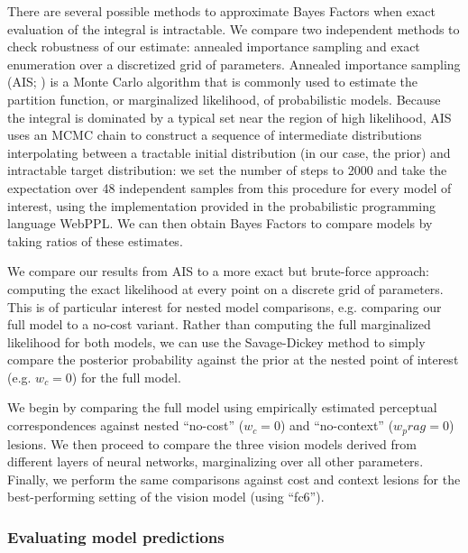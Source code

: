 \documentclass[9pt,twocolumn,twoside]{pnas-new}
\begin{document}
{There are several possible methods to approximate Bayes Factors when exact evaluation of the integral is intractable. We compare two independent methods to check robustness of our estimate: annealed importance sampling and exact enumeration over a discretized grid of parameters. Annealed importance sampling (AIS; \cite{neal2001}) is a Monte Carlo algorithm that is commonly used to estimate the partition function, or marginalized likelihood, of probabilistic models. Because the integral is dominated by a typical set near the region of high likelihood, AIS uses an MCMC chain to construct a sequence of intermediate distributions interpolating between a tractable initial distribution (in our case, the prior) and intractable target distribution: we set the number of steps to 2000 and take the expectation over 48 independent samples from this procedure for every model of interest, using the implementation provided in the probabilistic programming language WebPPL. We can then obtain Bayes Factors to compare models by taking ratios of these estimates.

We compare our results from AIS to a more exact but brute-force approach: computing the exact likelihood at every point on a discrete grid of parameters.
This is of particular interest for nested model comparisons, e.g. comparing our full model to a no-cost variant.
Rather than computing the full marginalized likelihood for both models, we can use the Savage-Dickey method \cite{WagenmakersEtAl10} to simply compare the posterior probability against the prior at the nested point of interest (e.g. $w_c = 0$) for the full model.

We begin by comparing the full model using empirically estimated perceptual correspondences against nested ``no-cost'' ($w_c = 0$) and ``no-context'' ($w_prag = 0$) lesions. We then proceed to compare the three vision models derived from different layers of neural networks, marginalizing over all other parameters. Finally, we perform the same comparisons against cost and context lesions for the best-performing setting of the vision model (using ``fc6'').

\subsubsection*{Evaluating model predictions}

}
\end{document}

